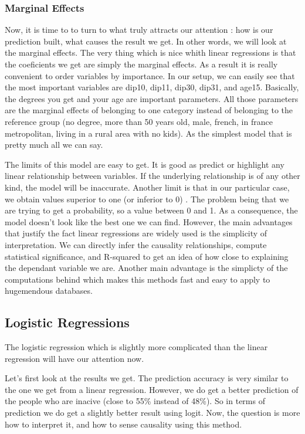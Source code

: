 \subsubsection{Marginal Effects}
Now, it is time to to turn to what truly attracts our attention : how is our prediction built, what causes the result we get. In other words, we will look at the marginal effects.
The very thing which is nice whith linear regressions is that the coeficients we get are simply the marginal effects. As a result it is really convenient to order variables by importance. In our setup, we can easily see that the most important variables are dip10, dip11, dip30, dip31, and age15. Basically, the degrees you get and your age are important parameters.
All those parameters are the marginal effects of belonging to one category instead of belonging to the reference group (no degree, more than 50 years old, male, french, in france metropolitan, living in a rural area with no kids).
As the simplest model that is pretty much all we can say.

The limits of this model are easy to get. It is good as predict or highlight any linear relationship between variables. If the underlying relationship is of any other kind, the model will be inaccurate. Another limit is that in our particular case, we obtain values superior to one (or inferior to 0) . The problem being that we are trying to get a probability, so a value between 0 and 1. As a consequence, the model doesn’t look like the best one we can find.
However, the main advantages that justify the fact linear regressions are widely used is the simplicity of interpretation. We can directly infer the causality relationships, compute statistical significance, and R-squared to get an idea of how close to explaining the dependant variable we are.  Another main advantage is the simplicty of the computations behind which makes this methods fast and easy to apply to hugemendous databases.

\subsection{Logistic Regressions}
The logistic regression which is slightly more complicated than the linear regression will have our attention now.


Let’s first look at the results we get. The prediction accuracy is very similar to the one we get from a linear regression. However, we do get a better prediction of the people who are inacive (close to 55\% instead of 48\%). So in terms of prediction we do get a slightly better result using logit.
Now, the question is more how to interpret it, and how to sense causality using this method.

